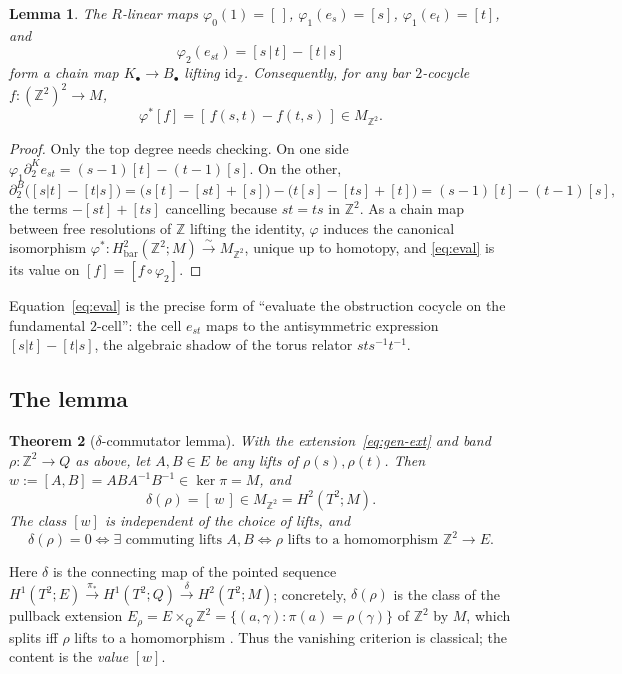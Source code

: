 \documentclass[11pt]{article}
\newtheorem{theorem}{Theorem}
\newtheorem{lemma}[theorem]{Lemma}
\theoremstyle{definition}
\newcommand{\id}{\mathrm{id}}
\newcommand{\Z}{\mathbb{Z}}
\begin{document}
\begin{lemma}\label{lem:compare}
The $R$-linear maps $\varphi_0(1)=[\,]$, $\varphi_1(e_s)=[s]$, $\varphi_1(e_t)=[t]$, and
\[
\varphi_2(e_{st})=[s\,|\,t]-[t\,|\,s]
\]
form a chain map $K_\bullet\to B_\bullet$ lifting $\id_\Z$. Consequently, for any bar
$2$-cocycle $f\colon(\Z^2)^2\to M$,
\begin{equation}\label{eq:eval}
\varphi^*[f]=[\,f(s,t)-f(t,s)\,]\in M_{\Z^2}.
\end{equation}
\end{lemma}

\begin{proof}
Only the top degree needs checking. On one side
$\varphi_1\partial_2^K e_{st}=(s-1)[t]-(t-1)[s]$. On the other,
\[
\partial_2^B\big([s|t]-[t|s]\big)=\big(s[t]-[st]+[s]\big)-\big(t[s]-[ts]+[t]\big)
= (s-1)[t]-(t-1)[s],
\]
the terms $-[st]+[ts]$ cancelling because $st=ts$ in $\Z^2$. As a chain map between free
resolutions of $\Z$ lifting the identity, $\varphi$ induces the canonical isomorphism
$\varphi^*\colon H^2_{\mathrm{bar}}(\Z^2;M)\xrightarrow{\sim}M_{\Z^2}$, unique up to homotopy,
and \eqref{eq:eval} is its value on $[f]=[f\circ\varphi_2]$.
\end{proof}

Equation~\eqref{eq:eval} is the precise form of ``evaluate the obstruction cocycle on the
fundamental $2$-cell'': the cell $e_{st}$ maps to the antisymmetric expression
$[s|t]-[t|s]$, the algebraic shadow of the torus relator $sts^{-1}t^{-1}$.

\subsection{The lemma}\label{sub:delta}

\begin{theorem}[$\delta$-commutator lemma]\label{thm:delta}
With the extension~\eqref{eq:gen-ext} and band $\rho\colon\Z^2\to Q$ as above, let
$A,B\in E$ be any lifts of $\rho(s),\rho(t)$. Then $w:=[A,B]=ABA^{-1}B^{-1}\in\ker\pi=M$, and
\[
\delta(\rho)=[\,w\,]\in M_{\Z^2}=H^2(T^2;M).
\]
The class $[w]$ is independent of the choice of lifts, and
\[
\delta(\rho)=0\iff\exists\text{ commuting lifts }A,B\iff\rho\text{ lifts to a homomorphism }\Z^2\to E.
\]
\end{theorem}

Here $\delta$ is the connecting map of the pointed sequence
$H^1(T^2;E)\xrightarrow{\pi_*}H^1(T^2;Q)\xrightarrow{\delta}H^2(T^2;M)$; concretely,
$\delta(\rho)$ is the class of the pullback extension
$E_\rho=E\times_Q\Z^2=\{(a,\gamma):\pi(a)=\rho(\gamma)\}$ of $\Z^2$ by $M$, which splits iff
$\rho$ lifts to a homomorphism \cite[IV.3--4]{brown}. Thus the vanishing criterion is
classical; the content is the \emph{value} $[w]$.
\end{document}
